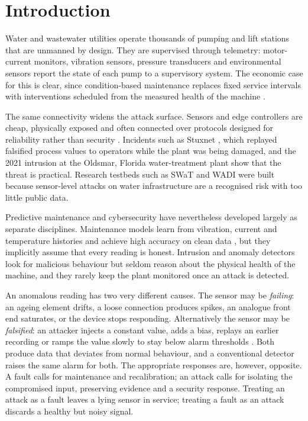 \documentclass[11pt,a4paper]{article}
\begin{document}
\newpage

\section{Introduction}

Water and wastewater utilities operate thousands of pumping and lift stations that are unmanned by design. They are supervised through telemetry: motor-current monitors, vibration sensors, pressure transducers and environmental sensors report the state of each pump to a supervisory system. The economic case for this is clear, since condition-based maintenance replaces fixed service intervals with interventions scheduled from the measured health of the machine \cite{lee2014phm,susto2015pdm,ran2019pdmsurvey}.

The same connectivity widens the attack surface. Sensors and edge controllers are cheap, physically exposed and often connected over protocols designed for reliability rather than security \cite{sicari2015road,roman2013features}. Incidents such as Stuxnet \cite{langner2011stuxnet}, which replayed falsified process values to operators while the plant was being damaged, and the 2021 intrusion at the Oldsmar, Florida water-treatment plant show that the threat is practical. Research testbeds such as SWaT and WADI \cite{goh2016swat,ahmed2017wadi} were built because sensor-level attacks on water infrastructure are a recognised risk with too little public data.

Predictive maintenance and cybersecurity have nevertheless developed largely as separate disciplines. Maintenance models learn from vibration, current and temperature histories and achieve high accuracy on clean data \cite{zhang2017wdcnn,zhao2019dlhealth}, but they implicitly assume that every reading is honest. Intrusion and anomaly detectors look for malicious behaviour \cite{liu2008iforest,goh2017rnn,kravchik2018cnn} but seldom reason about the physical health of the machine, and they rarely keep the plant monitored once an attack is detected.

An anomalous reading has two very different causes. The sensor may be \emph{failing}: an ageing element drifts, a loose connection produces spikes, an analogue front end saturates, or the device stops responding. Alternatively the sensor may be \emph{falsified}: an attacker injects a constant value, adds a bias, replays an earlier recording or ramps the value slowly to stay below alarm thresholds \cite{liu2009fdi,mo2009replay}. Both produce data that deviates from normal behaviour, and a conventional detector raises the same alarm for both. The appropriate responses are, however, opposite. A fault calls for maintenance and recalibration; an attack calls for isolating the compromised input, preserving evidence and a security response. Treating an attack as a fault leaves a lying sensor in service; treating a fault as an attack discards a healthy but noisy signal.
\end{document}
